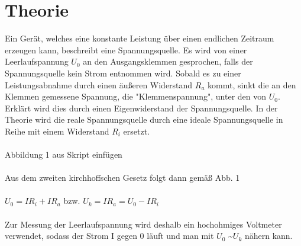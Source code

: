 \section{Theorie}
\label{sec:Theorie}

Ein Gerät, welches eine konstante Leistung über
einen endlichen Zeitraum erzeugen kann, beschreibt eine Spannungsquelle. Es wird von einer Leerlaufspannung $ U_0 $
an den Ausgangsklemmen gesprochen, falls der Spannungsquelle kein Strom entnommen wird.
Sobald es zu einer Leistungsabnahme durch einen äußeren Widerstand $ R_a $ kommt,
sinkt die an den Klemmen gemessene Spannung, die "Klemmenspannung", unter den von $ U_0 $. Erklärt wird
dies durch einen Eigenwiderstand der Spannungsquelle. In der Theorie wird die reale
Spannungsquelle durch eine ideale Spannungsquelle in Reihe mit einem Widerstand $ R_i$
ersetzt.
\\
\\
{\huge Abbildung 1 aus Skript einfügen}
\\
\\
Aus dem zweiten kirchhoffschen Gesetz folgt dann gemäß Abb. 1
\\
\\
$ U_0 = I R_i + I R_a $ bzw. $ U_k = I R_a = U_0-IR_i$
\\
\\
Zur Messung der Leerlaufspannung wird deshalb ein hochohmiges Voltmeter verwendet,
sodass der Strom I gegen 0 läuft und man mit $ U_0 $ \textasciitilde $U_k$ nähern kann.

